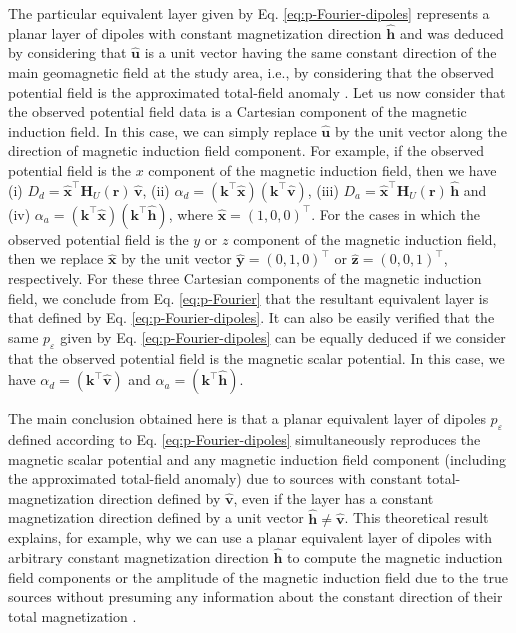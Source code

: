 The particular equivalent layer given by Eq. \ref{eq:p-Fourier-dipoles} represents a 
planar layer of dipoles with constant magnetization direction $\hat{\mathbf{h}}$ and was 
deduced by considering
that $\hat{\mathbf{u}}$ is a unit vector having the same constant direction of the main 
geomagnetic field at the study area, i.e., by considering that the observed potential field is 
the approximated total-field anomaly \citep[e.g.,][p. 179]{blakely1996}.
Let us now consider that the observed potential field data is a Cartesian component of the 
magnetic induction field. In this case, we can simply replace $\hat{\mathbf{u}}$ by the unit 
vector along the direction of 
magnetic induction field component. For example, if the observed potential field is the $x$ 
component of the magnetic induction field, then we have
(i) $D_{d} = \hat{\mathbf{x}}^{\top} \mathbf{H}_{U}(\mathbf{r}) \, \hat{\mathbf{v}}$, 
(ii) $\alpha_{d} = \left(\mathbf{k}^{\top} \hat{\mathbf{x}} \right)\left(\mathbf{k}^{\top} \hat{\mathbf{v}} \right)$,
(iii) $D_{a} = \hat{\mathbf{x}}^{\top} \mathbf{H}_{U}(\mathbf{r}) \, \hat{\mathbf{h}}$ and
(iv) $\alpha_{a} = \left(\mathbf{k}^{\top} \hat{\mathbf{x}} \right)\left(\mathbf{k}^{\top} \hat{\mathbf{h}} \right)$,
where $\hat{\mathbf{x}} = (1, 0, 0)^{\top}$. For the cases in which the observed potential field is the $y$ or 
$z$ component of the magnetic induction field, then we replace $\hat{\mathbf{x}}$ by the 
unit vector $\hat{\mathbf{y}} = (0, 1, 0)^{\top}$ or $\hat{\mathbf{z}} = (0, 0, 1)^{\top}$,
respectively. For these three Cartesian components of the magnetic induction field, we conclude from Eq. 
\ref{eq:p-Fourier} that the resultant equivalent layer is that defined by Eq. \ref{eq:p-Fourier-dipoles}.
It can also be easily verified that the same $p_{\varepsilon}$ given by Eq. 
\ref{eq:p-Fourier-dipoles} can be equally deduced if we consider that the 
observed potential field is the magnetic scalar potential. 
In this case, we have $\alpha_{d} = \left(\mathbf{k}^{\top} \hat{\mathbf{v}} \right)$ and 
$\alpha_{a} = \left(\mathbf{k}^{\top} \hat{\mathbf{h}} \right)$. 

The main conclusion obtained here is that a planar equivalent layer of dipoles $p_{\varepsilon}$ defined according 
to Eq. \ref{eq:p-Fourier-dipoles} simultaneously 
reproduces the magnetic scalar potential and any magnetic induction field component (including the approximated total-field anomaly) 
due to sources with constant total-magnetization direction defined by $\hat{\mathbf{v}}$, even if the layer has a constant magnetization 
direction defined by a unit vector $\hat{\mathbf{h}} \ne \hat{\mathbf{v}}$. 
This theoretical result explains, for example, why we can use a planar equivalent layer of dipoles with arbitrary constant 
magnetization direction $\hat{\mathbf{h}}$ to compute the magnetic induction field components or the amplitude of the 
magnetic induction field due to the true sources without presuming any information about the constant direction of their 
total magnetization \cite[e.g,][]{li_etal_2021}.


